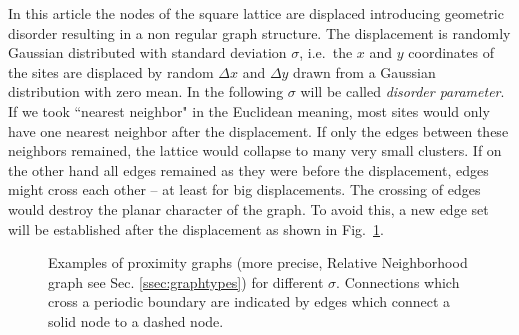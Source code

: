     In this article the nodes of the square lattice are
    displaced introducing geometric disorder resulting in a non regular graph
    structure.
    The displacement is randomly Gaussian distributed with standard
    deviation \(\sigma\), i.e.~the \(x\) and \(y\) coordinates of the
    sites are displaced by random \(\Delta x\) and \(\Delta y\) drawn
    from a Gaussian distribution with zero mean.
    In the following \(\sigma\) will be called \emph{disorder parameter}.
    If we took ``nearest neighbor" in the Euclidean meaning, most sites
    would only have one nearest neighbor after the
    displacement. If only the edges between these neighbors remained,
    the lattice would collapse to many very small clusters. If on the
    other hand all edges remained as they were before the displacement,
    edges might cross each other -- at least for big displacements.
    The crossing of edges would destroy the planar character of the graph.
    To avoid this, a new edge set will be established after the displacement
    as shown in Fig.~\ref{fig:RNG_sigma}.
    \begin{figure}[htb]
        \centering
        \caption[Examples of RNG for different $\sigma$]
        {
            Examples of proximity graphs (more precise, Relative Neighborhood
            graph see Sec. \ref{ssec:graphtypes}) for different $\sigma$.
            Connections which cross a periodic boundary are indicated
            by edges which connect a solid node to a dashed node.
        }
        \label{fig:RNG_sigma}
    \end{figure}
